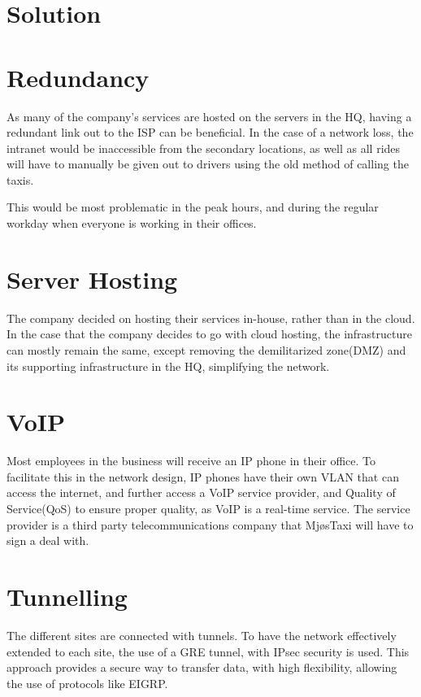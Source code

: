 \section{Solution}



\section{Redundancy}
As many of the company's services are hosted on the servers in the HQ, having a redundant link out to the ISP can be beneficial.
In the case of a network loss, the intranet would be inaccessible from the secondary locations, as well as all rides will have to manually be given out to drivers using the old method of calling the taxis.

This would be most problematic in the peak hours, and during the regular workday when everyone is working in their offices.

\section{Server Hosting}
The company decided on hosting their services in-house, rather than in the cloud.
In the case that the company decides to go with cloud hosting, the infrastructure can mostly remain the same, except removing the demilitarized zone(DMZ) and its supporting infrastructure in the HQ, simplifying the network.



\section{VoIP}
Most employees in the business will receive an IP phone in their office.
To facilitate this in the network design, IP phones have their own VLAN that can access the internet, and further access a VoIP service provider, and Quality of Service(QoS) to ensure proper quality, as VoIP is a real-time service. 
The service provider is a third party telecommunications company that MjøsTaxi will have to sign a deal with.

\section{Tunnelling}
The different sites are connected with tunnels.
To have the network effectively extended to each site, the use of a GRE tunnel, with IPsec security is used.
This approach provides a secure way to transfer data, with high flexibility, allowing the use of protocols like EIGRP.